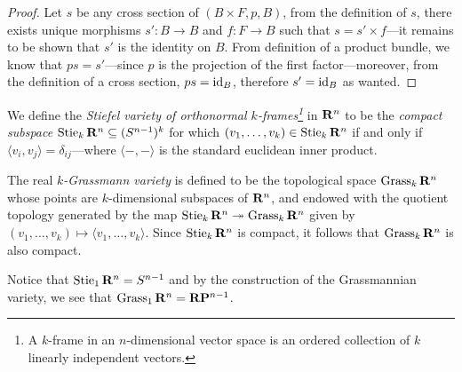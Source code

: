 \documentclass[../../../deep-dive]{subfile}
\begin{document}
\begin{proof}
    Let \(s\) be any cross section of \((B \times F, p, B)\), from the definition of
    \(s\), there exists unique morphisms \(s': B \to B\) and \(f: F \to B\) such
    that \(s = s' \times f\)---it remains to be shown that \(s'\) is the identity on
    \(B\). From definition of a product bundle, we know that \(p s = s'\)---since
    \(p\) is the projection of the first factor---moreover, from the definition of a
    cross section, \(p s = \operatorname{id}_B\), therefore \(s' = \operatorname{id}_B\) as wanted.
\end{proof}

\begin{definition}
    \label{def:stiefel-variety}
    We define the \emph{Stiefel variety of orthonormal \(k\)-frames\footnote{ A
            \(k\)-frame in an \(n\)-dimensional vector space is an ordered collection of
            \(k\) linearly independent vectors.  }} in \(\mathbf{R}^n\) to be the \emph{compact
        subspace} \(\operatorname{Stie}_k \mathbf{R}^n \subseteq (S^{n-1})^k\) for which
    \((v_1, \dots, v_k) \in \operatorname{Stie}_k \mathbf{R}^n\) if and only if
    \(\langle v_i, v_j \rangle = \delta_{ij}\)---where \(\langle -, - \rangle\) is
    the standard euclidean inner product.
\end{definition}

\begin{definition}
    \label{def:grassmann-variety}
    The real \emph{\(k\)-Grassmann variety} is defined to be the topological space
    \(\operatorname{Grass}_k \mathbf{R}^n\) whose points are \(k\)-dimensional subspaces of \(\mathbf{R}^n\), and
    endowed with the quotient topology generated by the map
    \(\operatorname{Stie}_k \mathbf{R}^n \twoheadrightarrow \operatorname{Grass}_k \mathbf{R}^n\) given by
    \((v_1, \dots, v_k) \mapsto \langle v_1, \dots, v_k \rangle\). Since
    \(\operatorname{Stie}_k \mathbf{R}^n\) is compact, it follows that \(\operatorname{Grass}_k \mathbf{R}^n\) is also compact.
\end{definition}

\begin{example}
    \label{exp:grassmanian-projective-space}
    Notice that \(\operatorname{Stie}_1 \mathbf{R}^n = S^{n-1}\) and by the construction of the
    Grassmannian variety, we see that \(\operatorname{Grass}_1 \mathbf{R}^n = \mathbf{R} \mathbf{P}^{n-1}\).
\end{example}
\end{document}

